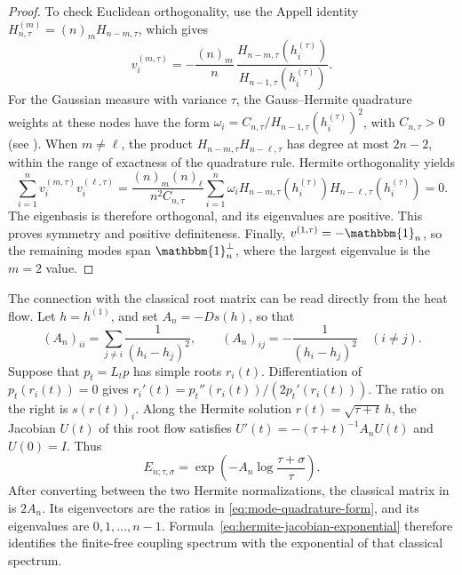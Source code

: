 \documentclass[12pt,reqno]{amsart}
\theoremstyle{definition}
\theoremstyle{remark}
\newcommand{\one}{\mathbbm{1}_n}
\begin{document}
\begin{proof}
To check Euclidean orthogonality, use the Appell identity
\(H_{n,\tau}^{(m)}=(n)_mH_{n-m,\tau}\), which gives
\begin{equation}\label{eq:mode-quadrature-form}
 v_i^{(m,\tau)}
 =-\frac{(n)_m}{n}\,
 \frac{H_{n-m,\tau}(h_i^{(\tau)})}
      {H_{n-1,\tau}(h_i^{(\tau)})}.
\end{equation}
For the Gaussian measure with variance \(\tau\), the Gauss--Hermite
quadrature weights at these nodes have the form
\(\omega_i=C_{n,\tau}/H_{n-1,\tau}(h_i^{(\tau)})^2\), with
\(C_{n,\tau}>0\) (see \cite{Szego75}).  When \(m\ne\ell\), the product
\(H_{n-m,\tau}H_{n-\ell,\tau}\) has degree at most \(2n-2\), within the
range of exactness of the quadrature rule.  Hermite orthogonality yields
\begin{equation}\label{eq:mode-orthogonality}
 \sum_{i=1}^n v_i^{(m,\tau)}v_i^{(\ell,\tau)}
 =\frac{(n)_m(n)_\ell}{n^2C_{n,\tau}}
 \sum_{i=1}^n\omega_i
 H_{n-m,\tau}(h_i^{(\tau)})H_{n-\ell,\tau}(h_i^{(\tau)})=0.
\end{equation}
The eigenbasis is therefore orthogonal, and its eigenvalues are positive.
This proves symmetry and positive definiteness.  Finally,
\(v^{(1,\tau)}=-\one\), so the remaining modes span \(\one^\perp\),
where the largest eigenvalue is the \(m=2\) value.
\end{proof}

The connection with the classical root matrix can be read directly from
the heat flow.  Let \(h=h^{(1)}\), and set \(A_n=-Ds(h)\), so that
\begin{equation}\label{eq:classical-hermite-root-matrix}
 (A_n)_{ii}=\sum_{j\ne i}\frac1{(h_i-h_j)^2},
 \qquad (A_n)_{ij}=-\frac1{(h_i-h_j)^2}\quad(i\ne j).
\end{equation}
Suppose that \(p_t=L_tp\) has simple roots \(r_i(t)\).  Differentiation of
\(p_t(r_i(t))=0\) gives \(r_i'(t)=p_t''(r_i(t))/(2p_t'(r_i(t)))\).
The ratio on the right is \(s(r(t))_i\).
Along the Hermite solution \(r(t)=\sqrt{\tau+t}\,h\), the Jacobian
\(U(t)\) of this root flow satisfies
\(U'(t)=-(\tau+t)^{-1}A_nU(t)\) and \(U(0)=I\).  Thus
\begin{equation}\label{eq:hermite-jacobian-exponential}
 E_{n;\tau,\sigma}
 =\exp\!\left(-A_n\log\frac{\tau+\sigma}{\tau}\right).
\end{equation}
After converting between the two Hermite normalizations, the classical
matrix in \cite[\S4.1]{Sasaki15} is \(2A_n\).  Its eigenvectors are the
ratios in \eqref{eq:mode-quadrature-form}, and its eigenvalues are
\(0,1,\ldots,n-1\).  Formula~\eqref{eq:hermite-jacobian-exponential}
therefore identifies the finite-free coupling spectrum with the exponential
of that classical spectrum.
\end{document}

